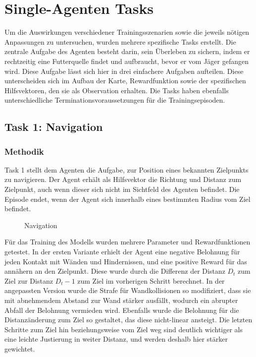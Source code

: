 \chapter{Single-Agenten Tasks}
\label{chap:single-tasks}
Um die Auswirkungen verschiedener Trainingsszenarien sowie die jeweils nötigen Anpassungen zu untersuchen, wurden mehrere spezifische Tasks erstellt. Die zentrale Aufgabe des Agenten besteht darin, sein Überleben zu sichern, indem er rechtzeitig eine Futterquelle findet und aufbraucht, bevor er vom Jäger gefangen wird. Diese Aufgabe lässt sich hier in drei einfachere Aufgaben aufteilen. Diese unterscheiden sich im Aufbau der Karte, Rewardfunktion sowie der spezifischen Hilfsvektoren, den sie als Observation erhalten. Die Tasks haben ebenfalls unterschiedliche Terminationsvoraussetzungen für die Trainingsepisoden.

\section{Task 1: Navigation}
\subsection{Methodik}
Task 1 stellt dem Agenten die Aufgabe, zur Position eines bekannten Zielpunkts zu navigieren. Der Agent erhält als Hilfsvektor die Richtung und Distanz zum Zielpunkt, auch wenn dieser sich nicht im Sichtfeld des Agenten befindet. Die Episode endet, wenn der Agent sich innerhalb eines bestimmten Radius vom Ziel befindet. 

\begin{figure}[htbp]
  \centering
  \caption{Navigation}
  \label{fig:navigate_scenario}
\end{figure}

Für das Training des Modells wurden mehrere Parameter und Rewardfunktionen getestet. In der ersten Variante erhielt der Agent eine negative Belohnung für jeden Kontakt mit Wänden und Hindernissen, und eine positive Reward für das annähern an den Zielpunkt. Diese wurde durch die Differenz der Distanz $D_t$ zum Ziel zur Distanz $D_t-1$ zum Ziel im vorherigen Schritt berechnet. In der angepassten Version wurde die Strafe für Wandkollisionen so modifiziert, dass sie mit abnehmendem Abstand zur Wand stärker ausfällt, wodurch ein abrupter Abfall der Belohnung vermieden wird. Ebenfalls wurde die Belohnung für die Distanzänderung zum Ziel so gestaltet, das diese nicht-linear ansteigt. Die letzten Schritte zum Ziel hin beziehungsweise vom Ziel weg sind deutlich wichtiger als eine leichte Justierung in weiter Distanz, und werden deshalb hier stärker gewichtet.

